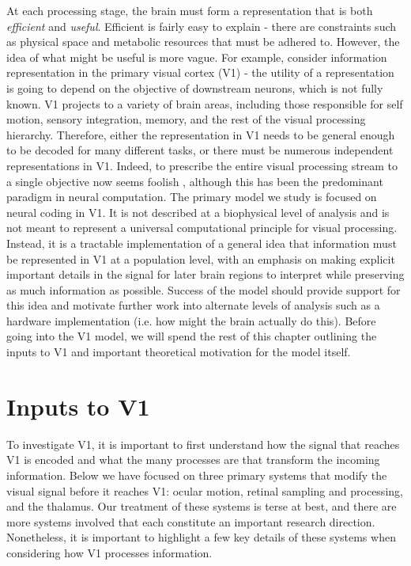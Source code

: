 At each processing stage, the brain must form a representation that is both \textit{efficient} and \textit{useful}. Efficient is fairly easy to explain - there are constraints such as physical space and metabolic resources that must be adhered to. However, the idea of what might be useful is more vague. For example, consider information representation in the primary visual cortex (V1) - the utility of a representation is going to depend on the objective of downstream neurons, which is not fully known. V1 projects to a variety of brain areas, including those responsible for self motion, sensory integration, memory, and the rest of the visual processing hierarchy. Therefore, either the representation in V1 needs to be general enough to be decoded for many different tasks, or there must be numerous independent representations in V1. Indeed, to prescribe the entire visual processing stream to a single objective now seems foolish \parencite{barlow2001redundancy}, although this has been the predominant paradigm in neural computation. The primary model we study is focused on neural coding in V1. It is not described at a biophysical level of analysis and is not meant to represent a universal computational principle for visual processing. Instead, it is a tractable implementation of a general idea that information must be represented in V1 at a population level, with an emphasis on making explicit important details in the signal for later brain regions to interpret while preserving as much information as possible. Success of the model should provide support for this idea and motivate further work into alternate levels of analysis such as a hardware implementation (i.e. how might the brain actually do this). Before going into the V1 model, we will spend the rest of this chapter outlining the inputs to V1 and important theoretical motivation for the model itself.


\section{Inputs to V1}
To investigate V1, it is important to first understand how the signal that reaches V1 is encoded and what the many processes are that transform the incoming information. Below we have focused on three primary systems that modify the visual signal before it reaches V1: ocular motion, retinal sampling and processing, and the thalamus. Our treatment of these systems is terse at best, and there are more systems involved that each constitute an important research direction. Nonetheless, it is important to highlight a few key details of these systems when considering how V1 processes information.


